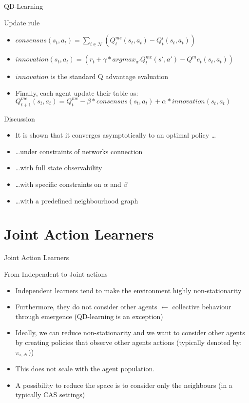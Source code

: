 \documentclass[presentation]{beamer}\mode<presentation>{\usetheme{AMSBolognaFC}}
\begin{document}
\begin{frame}{QD-Learning}
	\begin{exampleblock}{Update rule}
		\begin{itemize}
			\item $consensus(s_t, a_t) = \sum_{i \in \mathcal{N}} (Q^{me}_t(s_t, a_t) - Q^i_t(s_t, a_t))$
			\item $innovation(s_t, a_t) = (r_t + \gamma*argmax_{a'}Q^{me}_t(s', a') - Q^me_t(s_t, a_t))$
			\item $innovation$ is the standard Q advantage evaluation
			\item Finally, each agent update their table as: $Q^{me}_{t + 1}(s_t, a_t) = Q^{me}_t - \beta * consensus(s_t, a_t) + \alpha * innovation(s_t, a_t)$
		\end{itemize}		
	\end{exampleblock}
	\begin{alertblock}{Discussion}
		\begin{itemize}
			\item[{\color{teal} \faThumbsUp}] It is shown that it converges asymptotically to an optimal policy \dots
			\item[{\color{red} \faThumbsDown}]\dots under constraints of networks connection
			\item[{\color{red} \faThumbsDown}]\dots with full state observability
			\item[{\color{red} \faThumbsDown}]\dots with specific constraints on $\alpha$ and $\beta$ 
			\item[{\color{red} \faThumbsDown}]\dots with a predefined neighbourhood graph 
		\end{itemize}
	\end{alertblock}
\end{frame}
\section{Joint Action Learners}

\begin{frame}{Joint Action Learners}
	\begin{alertblock}{From Independent to Joint actions}	
		\begin{itemize}
			\item Independent learners tend to make the environment highly non-stationarity
			\item Furthermore, they do not consider other agents $\leftarrow$ collective behaviour through emergence (QD-learning is an exception)
			\item Ideally, we can reduce non-stationarity and we want to consider other agents by creating policies that observe other agents actions (typically denoted by: $\pi_{i,\mathcal{N}}$))
			\item This does not scale with the agent population.
			\item A possibility to reduce the space is to consider only the neighbours (in a typically CAS settings)
		\end{itemize}
	\end{alertblock}
\end{frame}
\end{document}

